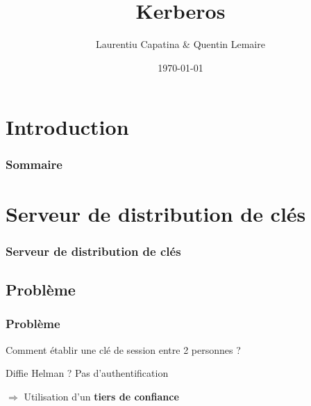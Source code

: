 \documentclass[svgnames]{beamer}
\title{Kerberos}
\author{Laurentiu Capatina \& Quentin Lemaire}
\date{\today}
\begin{document}
  
\maketitle %

\section*{Introduction}


\begin{frame}
  \frametitle{Sommaire}
  \tableofcontents
\end{frame}


\section{Serveur de distribution de clés}

\begin{frame}
  \frametitle{Serveur de distribution de clés}
\end{frame}


\subsection{Problème}
\begin{frame}
  \frametitle{Problème}
  
  \begin{center}
    Comment établir une clé de session entre 2 personnes ? %
  \end{center}
  
  \pause
  
  \begin{alertblock}{Diffie Helman ?}
    Pas d'authentification
  \end{alertblock}
  
  \pause
  
  $\Rightarrow$ Utilisation d'un \textbf{tiers de confiance}
  
%     
\end{frame}
\end{document}
